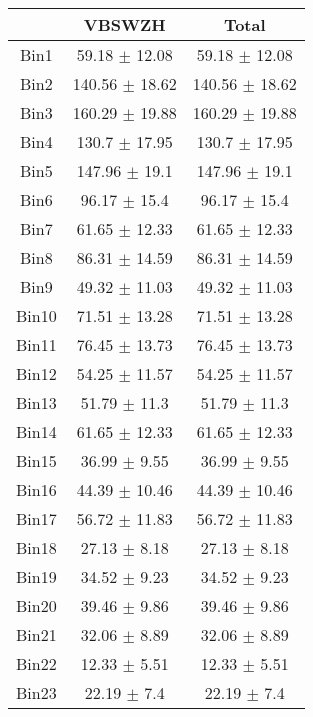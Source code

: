   \begin{tabular}{|c|c|c|}
  \hline
      & VBSWZH & Total \\ \cline{1-3} 
     \hline\hline
     Bin1 & 59.18 $\pm$ 12.08 & 59.18 $\pm$ 12.08 \\ \cline{1-3} 
     Bin2 & 140.56 $\pm$ 18.62 & 140.56 $\pm$ 18.62 \\ \cline{1-3} 
     Bin3 & 160.29 $\pm$ 19.88 & 160.29 $\pm$ 19.88 \\ \cline{1-3} 
     Bin4 & 130.7 $\pm$ 17.95 & 130.7 $\pm$ 17.95 \\ \cline{1-3} 
     Bin5 & 147.96 $\pm$ 19.1 & 147.96 $\pm$ 19.1 \\ \cline{1-3} 
     Bin6 & 96.17 $\pm$ 15.4 & 96.17 $\pm$ 15.4 \\ \cline{1-3} 
     Bin7 & 61.65 $\pm$ 12.33 & 61.65 $\pm$ 12.33 \\ \cline{1-3} 
     Bin8 & 86.31 $\pm$ 14.59 & 86.31 $\pm$ 14.59 \\ \cline{1-3} 
     Bin9 & 49.32 $\pm$ 11.03 & 49.32 $\pm$ 11.03 \\ \cline{1-3} 
     Bin10 & 71.51 $\pm$ 13.28 & 71.51 $\pm$ 13.28 \\ \cline{1-3} 
     Bin11 & 76.45 $\pm$ 13.73 & 76.45 $\pm$ 13.73 \\ \cline{1-3} 
     Bin12 & 54.25 $\pm$ 11.57 & 54.25 $\pm$ 11.57 \\ \cline{1-3} 
     Bin13 & 51.79 $\pm$ 11.3 & 51.79 $\pm$ 11.3 \\ \cline{1-3} 
     Bin14 & 61.65 $\pm$ 12.33 & 61.65 $\pm$ 12.33 \\ \cline{1-3} 
     Bin15 & 36.99 $\pm$ 9.55 & 36.99 $\pm$ 9.55 \\ \cline{1-3} 
     Bin16 & 44.39 $\pm$ 10.46 & 44.39 $\pm$ 10.46 \\ \cline{1-3} 
     Bin17 & 56.72 $\pm$ 11.83 & 56.72 $\pm$ 11.83 \\ \cline{1-3} 
     Bin18 & 27.13 $\pm$ 8.18 & 27.13 $\pm$ 8.18 \\ \cline{1-3} 
     Bin19 & 34.52 $\pm$ 9.23 & 34.52 $\pm$ 9.23 \\ \cline{1-3} 
     Bin20 & 39.46 $\pm$ 9.86 & 39.46 $\pm$ 9.86 \\ \cline{1-3} 
     Bin21 & 32.06 $\pm$ 8.89 & 32.06 $\pm$ 8.89 \\ \cline{1-3} 
     Bin22 & 12.33 $\pm$ 5.51 & 12.33 $\pm$ 5.51 \\ \cline{1-3} 
     Bin23 & 22.19 $\pm$ 7.4 & 22.19 $\pm$ 7.4 \\ \cline{1-3} 

\end{tabular}
